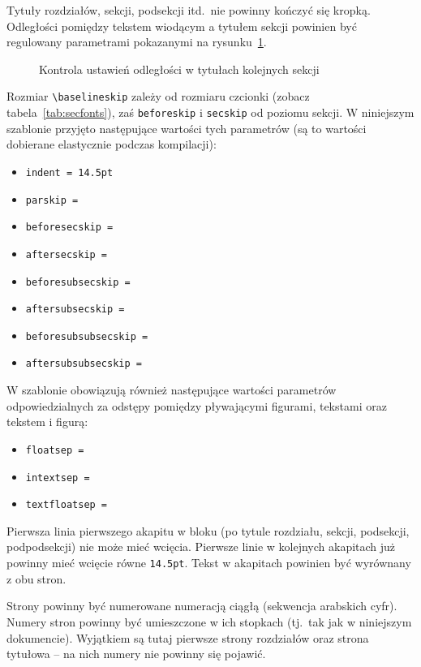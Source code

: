 Tytuły rozdziałów, sekcji, podsekcji itd.\ nie powinny kończyć się kropką. Odległości pomiędzy tekstem wiodącym a tytułem sekcji powinien być regulowany parametrami pokazanymi na rysunku~\ref{fig:LaySec}. 
\begin{figure}[t]
\runinheadfalse
\drawparameterstrue
\drawheading{\Large\bfseries}
\caption{Kontrola ustawień odległości w tytułach kolejnych sekcji} 
\label{fig:LaySec}
\end{figure}
Rozmiar \verb?\baselineskip? zależy od rozmiaru czcionki (zobacz tabela~\ref{tab:secfonts}), zaś \texttt{beforeskip} i \texttt{secskip} od poziomu sekcji. W niniejszym szablonie przyjęto następujące wartości tych parametrów (są to wartości dobierane elastycznie podczas kompilacji):
\begin{itemize}
\item \texttt{indent = 14.5pt}
\item \texttt{parskip = \printlength{\parskip}}
\item \texttt{beforesecskip = \printlength{\beforesecskip}}
\item \texttt{aftersecskip = \printlength{\aftersecskip}}
\item \texttt{beforesubsecskip = \printlength{\beforesubsecskip}}
\item \texttt{aftersubsecskip = \printlength{\aftersubsecskip}}
\item \texttt{beforesubsubsecskip = \printlength{\beforesubsecskip}}
\item \texttt{aftersubsubsecskip = \printlength{\aftersubsecskip}}
\end{itemize}

W szablonie obowiązują również następujące wartości parametrów odpowiedzialnych za odstępy pomiędzy pływającymi figurami, tekstami oraz tekstem i figurą:
\begin{itemize}
\item \texttt{floatsep = \printlength{\floatsep}}
\item \texttt{intextsep = \printlength{\intextsep}}
\item \texttt{textfloatsep = \printlength{\textfloatsep}}
\end{itemize}

Pierwsza linia pierwszego akapitu w bloku (po tytule rozdziału, sekcji, podsekcji, podpodsekcji) nie może mieć wcięcia. Pierwsze linie w kolejnych akapitach już powinny mieć wcięcie równe \texttt{14.5pt}. Tekst w akapitach powinien być wyrównany z obu stron. 


Strony powinny być numerowane numeracją ciągłą (sekwencja arabskich cyfr). Numery stron powinny być umieszczone w ich stopkach (tj.\ tak jak w niniejszym dokumencie). Wyjątkiem są tutaj pierwsze strony rozdziałów oraz strona tytułowa -- na nich numery nie powinny się pojawić.

